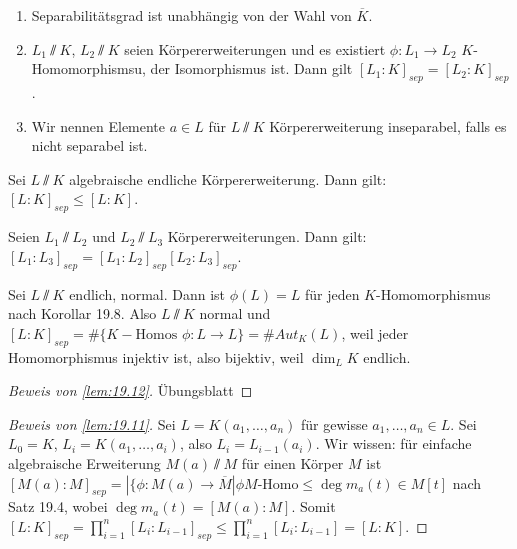 \documentclass[12pt,a4paper]{scrartcl}
\begin{document}
\begin{bem}\leavevmode\begin{enumerate}
		\item Separabilitätsgrad ist unabhängig von der Wahl von $\overline{K}$.
		\item $L_1\sslash K$, $L_2\sslash K$ seien Körpererweiterungen und es existiert $\phi\colon L_1\to L_2$ $K$-Homomorphismsu, der Isomorphismus ist. Dann gilt $[L_1:K]_{sep} = [L_2:K]_{sep}$.
		\item Wir nennen Elemente $a\in L$ für $L\sslash K$ Körpererweiterung inseparabel, falls es nicht separabel ist.
	\end{enumerate}
\end{bem}
\begin{lem}\label{lem:19.11}
	Sei $L\sslash K$ algebraische endliche Körpererweiterung. Dann gilt: $[L:K]_{sep}\leq [L:K]$.
\end{lem}
\begin{lem}\label{lem:19.12}
	Seien $L_1\sslash L_2$ und $L_2\sslash L_3$ Körpererweiterungen. Dann gilt:$[L_1:L_3]_{sep} = [L_1:L_2]_{sep}[L_2:L_3]_{sep}$.
\end{lem}
\begin{bem}
	Sei $L\sslash K$ endlich, normal. Dann ist $\phi(L) = L$ für jeden $K$-Homomorphismus nach Korollar 19.8. Also $L\sslash K$ normal und $[L:K]_{sep} = \#\{K-\text{Homos }\phi\colon L\to L\} = \#Aut_K(L)$, weil jeder Homomorphismus injektiv ist, also bijektiv, weil $\dim_LK$ endlich.
\end{bem}
\begin{proof}[Beweis von \ref{lem:19.12}]
	Übungsblatt
\end{proof}
\begin{proof}[Beweis von \ref{lem:19.11}] Sei $L = K(a_1,\dots, a_n)$ für gewisse $a_1,\dots, a_n\in L$. Sei $L_0 = K$, $L_i = K(a_1,\dots, a_i)$, also $L_i = L_{i-1}(a_i)$. Wir wissen: für einfache algebraische Erweiterung $M(a)\sslash M$ für einen Körper $M$ ist $[M(a):M]_{sep} = |\{\phi\colon M(a)\to \overline{M}|\phi M\text{-Homo}\leq \deg m_a(t)\in M[t]$ nach Satz 19.4, wobei $\deg m_a(t) = [M(a):M]$. Somit $[L:K]_{sep} = \prod_{i = 1}^n[L_i:L_{i-1}]_{sep} \leq \prod_{i = 1}^n[L_i:L_{i-1}] = [L:K]$.	
\end{proof}
\end{document}
